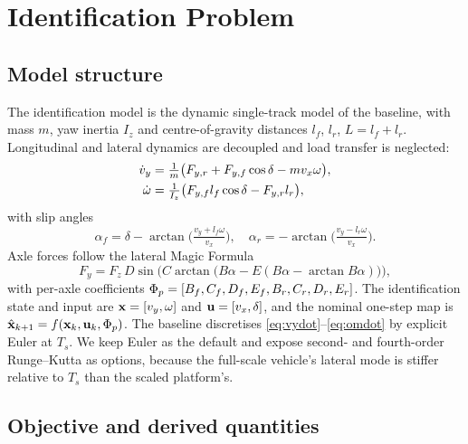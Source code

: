 \section{Identification Problem}
\label{sec:problem}

\subsection{Model structure}
\label{subsec:model}

The identification model is the dynamic single-track model of the baseline,
with mass $m$, yaw inertia $I_{z}$ and centre-of-gravity distances $l_{f}$,
$l_{r}$, $L=l_{f}+l_{r}$. Longitudinal and lateral dynamics are decoupled and
load transfer is neglected:
\begin{align}
\dot v_{y} &= \tfrac{1}{m}\big(F_{y,r}+F_{y,f}\cos\delta - m v_{x}\omega\big),\label{eq:vydot}\\
\dot\omega &= \tfrac{1}{I_{z}}\big(F_{y,f} l_{f}\cos\delta - F_{y,r} l_{r}\big),\label{eq:omdot}
\end{align}
with slip angles
\begin{equation}
\alpha_{f}=\delta-\arctan\!\Big(\tfrac{v_{y}+l_{f}\omega}{v_{x}}\Big),\quad
\alpha_{r}=-\arctan\!\Big(\tfrac{v_{y}-l_{r}\omega}{v_{x}}\Big).
\label{eq:slip}
\end{equation}
Axle forces follow the lateral Magic Formula
\begin{equation}
F_{y}=F_{z}\,D\sin\!\big(C\arctan\!\big(B\alpha-E(B\alpha-\arctan B\alpha)\big)\big),
\label{eq:mf}
\end{equation}
with per-axle coefficients
$\Phi_{p}=[B_{f},C_{f},D_{f},E_{f},B_{r},C_{r},D_{r},E_{r}]$. The identification
state and input are $\mathbf{x}=[v_{y},\omega]$ and $\mathbf{u}=[v_{x},\delta]$, and the
nominal one-step map is $\hat{\mathbf{x}}_{k+1}=f(\mathbf{x}_{k},\mathbf{u}_{k},\Phi_{p})$. The
baseline discretises \eqref{eq:vydot}--\eqref{eq:omdot} by explicit Euler at
$T_{s}$. We keep Euler as the default and expose second- and fourth-order
Runge--Kutta as options, because the full-scale vehicle's lateral mode is
stiffer relative to $T_{s}$ than the scaled platform's.

\subsection{Objective and derived quantities}


